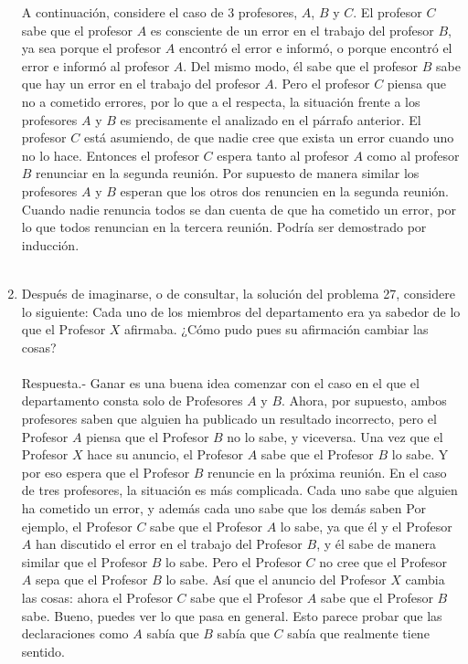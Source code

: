 \begin{enumerate}
	  A continuación, considere el caso de 3 profesores, $A$, $B$ y $C$. El profesor $C$ sabe que el profesor $A$ es consciente de un error en el trabajo del profesor $B$, ya sea porque el profesor $A$ encontró el error e informó, o porque encontró el error e informó al profesor $A$. Del mismo modo, él sabe que el profesor $B$ sabe que hay un error en el trabajo del profesor $A$. Pero el profesor $C$ piensa que no a cometido errores, por lo que a el respecta, la situación frente a los profesores $A$ y $B$ es precisamente el analizado en el párrafo anterior. El profesor $C$ está asumiendo, de que nadie cree que exista un error cuando uno no lo hace. Entonces el profesor $C$ espera tanto al profesor $A$ como al profesor $B$ renunciar en la segunda reunión. Por supuesto de manera similar los profesores $A$ y $B$ esperan que los otros dos renuncien en la segunda reunión. Cuando nadie renuncia todos se dan cuenta de que ha cometido un error, por lo que todos renuncian en la tercera reunión. Podría ser demostrado por inducción.\\\\ 

       \item Después de imaginarse, o de consultar, la solución del problema 27, considere lo siguiente: Cada uno de los miembros del departamento era ya sabedor de lo que el Profesor $X$ afirmaba. ¿Cómo pudo pues su afirmación cambiar las cosas?\\\\
          Respuesta.-\; Ganar es una buena idea comenzar con el caso en el que el departamento consta solo de Profesores $A$ y $B$. Ahora, por supuesto, ambos profesores saben que alguien ha publicado un resultado incorrecto, pero el Profesor $A$ piensa que el Profesor $B$ no lo sabe, y viceversa. Una vez que el Profesor $X$ hace su anuncio, el Profesor $A$ sabe que el Profesor $B$ lo sabe. Y por eso espera que el Profesor $B$ renuncie en la próxima reunión. En el caso de tres profesores, la situación es más complicada. Cada uno sabe que alguien ha cometido un error, y además cada uno sabe que los demás saben Por ejemplo, el Profesor $C$ sabe que el Profesor $A$ lo sabe, ya que él y el Profesor $A$ han discutido el error en el trabajo del Profesor $B$, y él sabe de manera similar que el Profesor $B$ lo sabe. Pero el Profesor $C$ no cree que el Profesor $A$ sepa que el Profesor $B$ lo sabe. Así que el anuncio del Profesor $X$ cambia las cosas: ahora el Profesor $C$ sabe que el Profesor $A$ sabe que el Profesor $B$ sabe. Bueno, puedes ver lo que pasa en general. Esto parece probar que las declaraciones como $A$ sabía que $B$ sabía que $C$ sabía que realmente tiene sentido.\\\\


    \end{enumerate}
    

